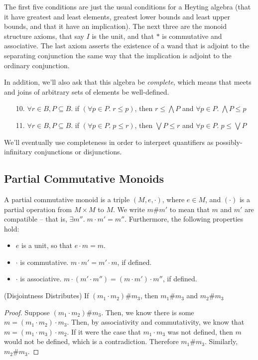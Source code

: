 The first five conditions are just the usual conditions for a Heyting
algebra (that it have greatest and least elements, greatest lower
bounds and least upper bounds, and that it have an implication). The
next three are the monoid structure axioms, that say $I$ is the unit,
and that $*$ is commutative and associative. The last axiom asserts
the existence of a wand that is adjoint to the separating conjunction
the same way that the implication is adjoint to the ordinary
conjunction.

In addition, we'll also ask that this algebra be \emph{complete},
which means that meets and joins of arbitrary sets of elements be
well-defined.

\begin{enumerate}
\item[10.] $\forall r\in B, P \subseteq B.$ if $(\forall p \in P.\; r \leq p)$, then  
      $r \leq \bigwedge P $ and 
      $\forall p \in P.\; \bigwedge P \leq p$
\item[11.] $\forall r \in B, P \subseteq B.$ if $(\forall p \in P.\; p \leq r)$, then  
      $\bigvee P \leq r$ and 
      $\forall p \in P.\; p \leq \bigvee P$
\end{enumerate}

We'll eventually use completeness in order to interpret quantifiers as 
possibly-infinitary conjunctions or disjunctions. 


\subsection{Partial Commutative Monoids}

A partial commutative monoid is a triple $(M, e, \cdot)$, where 
$e \in M$, and $(\cdot)$ is a partial operation from $M \times M$ to 
$M$. We write $m \# m'$ to mean that $m$ and $m'$ are compatible -- 
that is, $\exists m''.\; m \cdot m' = m''$. Furthermore, the following
properties hold: 

\begin{itemize}
\item $e$ is a unit, so that $e \cdot m = m$. 
\item $\cdot$ is commutative. $m \cdot m' = m' \cdot m$, if defined.
\item $\cdot$ is associative. $m \cdot (m' \cdot m'') = (m \cdot m') \cdot m''$, if defined.
\end{itemize}

\begin{lemma}{(Disjointness Distributes)}
If $(m_1\cdot m_2) \# m_3$, then $m_1 \# m_3$ and $m_2 \# m_3$
\end{lemma}
\begin{proof}
Suppose $(m_1\cdot m_2) \# m_3$. Then, we know there is some $m = (m_1 \cdot m_2) \cdot m_3$. 
Then, by associativity and commutativity, we know that $m = (m_1 \cdot m_3) \cdot m_2$. If
it were the case that $m_1 \cdot m_3$ was not defined, then $m$ would not be defined, which
is a contradiction. Therefore $m_1 \# m_3$. Similarly, $m_2 \# m_3$. 
\end{proof}


